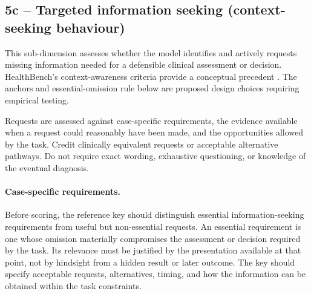 \documentclass{article}
\begin{document}
\subsection*{5c -- Targeted information seeking
(context-seeking behaviour)}

This sub-dimension assesses whether the model identifies and
actively requests missing information needed for a defensible
clinical assessment or decision. HealthBench's context-awareness
criteria provide a conceptual precedent
\cite{arora2025healthbench}. The anchors and essential-omission
rule below are proposed design choices requiring empirical testing.

Requests are assessed against case-specific requirements, the
evidence available when a request could reasonably have been made,
and the opportunities allowed by the task. Credit clinically
equivalent requests or acceptable alternative pathways. Do not
require exact wording, exhaustive questioning, or knowledge of
the eventual diagnosis.

\paragraph{Case-specific requirements.}
Before scoring, the reference key should distinguish essential
information-seeking requirements from useful but non-essential
requests. An essential requirement is one whose omission
materially compromises the assessment or decision required by
the task. Its relevance must be justified by the presentation
available at that point, not by hindsight from a hidden result
or later outcome. The key should specify acceptable requests,
alternatives, timing, and how the information can be obtained
within the task constraints.
\end{document}
